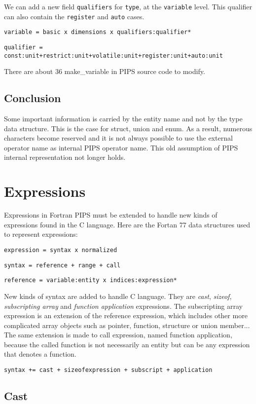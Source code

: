\documentclass[a4paper]{report}
\begin{document}
We can add a new field \verb/qualifiers/ for \verb/type/, at the
 \verb/variable/ level. This qualifier can also contain the
 \verb/register/ and \verb/auto/ cases.

\verb/variable = basic x dimensions x qualifiers:qualifier*/

\verb/qualifier = const:unit+restrict:unit+volatile:unit+register:unit+auto:unit/

There are about 36 make\_variable in PIPS source code to modify.

\section{Conclusion}

Some important information is carried by the entity name and not by
 the type data structure. This is the case for struct, union and
 enum. As a result, numerous characters become reserved and it is not
 always possible to use the external operator name as internal PIPS
 operator name. This old assumption of PIPS internal representation
 not longer holds.

\chapter{Expressions}
\label{chapter:expressions}

Expressions in Fortran PIPS must be extended to handle new kinds of
expressions found in the C language. Here are the Fortan 77 data structures used to represent expressions:

\verb/expression = syntax x normalized/

\verb/syntax = reference + range + call/

\verb/reference = variable:entity x indices:expression*/

New kinds of syntax are added to handle C language. They are {\it cast},
 {\it sizeof}, {\it subscripting array} and
{\it function application} expressions. The subscripting array expression
is an extension of the reference expression, which includes other
more complicated array objects such as pointer, function, 
structure or union member... The same extension is made to call
expression, named function application, because the called function is
not necessarily an entity but can be any expression that denotes a function.   

\verb/syntax += cast + sizeofexpression + subscript + application/

\section{Cast}
\end{document}
